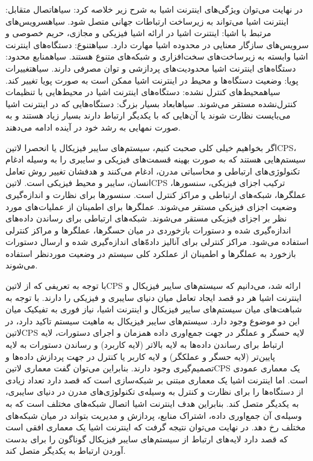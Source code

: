 در نهایت می‌توان ویژگی‌های اینترنت اشیا به شرح زیر خلاصه کرد:
 ‌سیاه{اتصال متقابل}: اینترنت اشیا می‌تواند به زیرساخت ارتباطات جهانی متصل شود.
 ‌سیاه{سرویس‌های مرتبط با اشیا}: اینتنرت اشیا در ارائه اشیا فیزیکی و مجازی، حریم خصوصی و سرویس‌های سازگار معنایی در محدوده اشیا مهارت دارد.
 ‌سیاه{تنوع}: دستگاه‌های اینترنت اشیا وابسته به زیرساخت‌های سخت‌افزاری و شبکه‌های متنوع هستند.
 ‌سیاه{منابع محدود}: دستگاه‌های اینترنت اشیا محدودیت‌های پردازشی و توان مصرفی دارند.
 ‌سیاه{تغییرات پویا}: وضعیت دستگاه‌ها و محیط در اینترنت اشیا ممکن است به صورت پویا تغییر کند.
 ‌سیاه{محیط‌های کنترل نشده}: دستگاه‌های اینترنت اشیا در محیط‌هایی با تنظیمات کنترل‌نشده مستقر می‌شوند.
 ‌سیاه{ابعاد بسیار بزرگ}: دستگاه‌هایی که در اینترنت اشیا می‌بایست نظارت شوند یا آن‌هایی که با یکدیگر ارتباط دارند بسیار زیاد هستند و به صورت نمهایی به رشد خود در آینده ادامه می‌دهند.


اگر بخواهیم خیلی کلی صحبت کنیم، سیستم‌های سایبر فیزیکال یا انحصرا ‌لاتین{CPS}، سیستم‌هایی هستند که به صورت بهینه قسمت‌های فیزیکی و سایبری را به وسیله ادغام تکنولوژی‌های ارتباطی و محاسباتی مدرن،
ادغام می‌کنند و هدفشان تغییر روش تعامل انسان، سایبر و محیط فیزیکی است.
‌لاتین{CPS} ترکیب اجزای فیزیکی، سنسورها، عملگرها، شبکه‌های ارتباطی و مراکز کنترل است. سنسورها برای نظارت و اندازه‌گیری وضعیت اجزای فیزیکی مستقر می‌شوند.
عملگرها برای اطمینان از عملیات‌های مورد نظر بر اجزای فیزیکی مستقر می‌شوند. شبکه‌های ارتباطی برای رساندن داده‌های اندازه‌گیری شده و دستورات بازخوردی در میان حسگرها، عملگرها و مراکز کنترلی استفاده می‌شود.
مراکز کنترلی برای آنالیز داده‌ّهای اندازه‌گیری شده و ارسال دستورات بازخورد به عملگرها و اطمینان از عملکرد کلی سیستم در وضعیت موردنظر استفاده می‌شوند.

با توجه به تعریفی که از ‌لاتین{CPS} ارائه شد، می‌دانیم که سیستم‌های سایبر فیزیکال و اینترنت اشیا هر دو قصد ایجاد تعامل میان دنیای سایبری و فیزیکی را دارند.
با توجه به شباهت‌های میان سیستم‌های سایبر فیزیکال و اینترنت اشیا، نیاز فوری به تفیکیک میان این دو موضوع وجود دارد.
سیستم‌های سایبر فیزیکال به ماهیت سیستم تاکید دارد، در ‌لاتین{CPS} لایه حسگر و عملگر در جهت جمع‌اوری داده همزمان و اجرای دستورات،
لایه ارتباط برای رساندن داده‌ها به لایه بالاتر (لایه کاربرد) و رساندن دستورات به لایه پایین‌تر (لایه حسگر و عملکگر) و لایه کاربر یا کنترل در جهت پردازش داده‌ها
و تصمیم‌گیری وجود دارند. بنابراین می‌توان گفت معماری ‌لاتین{CPS} یک معماری عمودی است.
اما اینترنت اشیا یک معماری مبتنی بر شبکه‌سازی است که قصد دارد تعداد زیادی از دستگاه‌ها را برای نظارت و کنترل به وسیله‌ی تکنولوژی‌های مدرن در دنیای سایبری، به یکدیگر متصل کند.
بنابراین هدف اینترنت اشیا اتصال شبکه‌های مختلف است که به وسیله‌ی آن جمع‌اوری داده، اشتراک منابع، پردازش و مدیریت بتواند در میان شبکه‌های مختلف رخ دهد.
در نهایت می‌توان نتیجه گرفت که اینترنت اشیا یک معماری افقی است که قصد دارد لایه‌های ارتباط از سیستم‌های سایبر فیزیکال گوناگون را برای بدست آوردن ارتباط به یکدیگر متصل کند.

